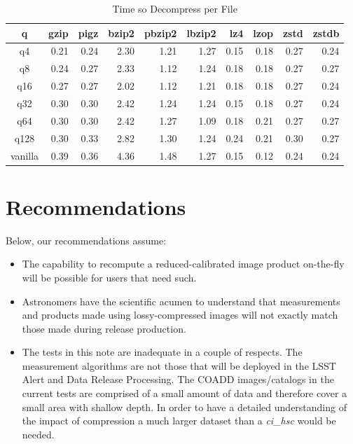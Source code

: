 \begin{table}
\caption{Time so Decompress per File}
\centering
\begin{tabular}[]{crrrrrrrrr}
\hline
 q        &  gzip & pigz & bzip2 & pbzip2 & lbzip2 & lz4 & lzop & zstd & zstdb  \\
\hline
 q4       &    0.21 &   0.24 &   2.30 &   1.21 &   1.27 &   0.15 &   0.18 &   0.27 &   0.24  \\
 q8       &    0.24 &   0.27 &   2.33 &   1.12 &   1.24 &   0.18 &   0.18 &   0.27 &   0.27  \\
 q16      &    0.27 &   0.27 &   2.02 &   1.12 &   1.21 &   0.18 &   0.18 &   0.27 &   0.24  \\
 q32      &    0.30 &   0.30 &   2.42 &   1.24 &   1.24 &   0.15 &   0.18 &   0.27 &   0.24  \\
 q64      &    0.30 &   0.30 &   2.42 &   1.27 &   1.09 &   0.18 &   0.21 &   0.27 &   0.27  \\
 q128     &    0.30 &   0.33 &   2.82 &   1.30 &   1.24 &   0.24 &   0.21 &   0.30 &   0.27  \\
 vanilla  &    0.39 &   0.36 &   4.36 &   1.48 &   1.27 &   0.15 &   0.12 &   0.24 &   0.24  \\
\hline
\end{tabular}
\label{timing_decompress}
\end{table}




\section{Recommendations}

Below, our recommendations assume:
\begin{itemize}
\item The capability to recompute a reduced-calibrated image product on-the-fly will be possible for users that need such.
\item Astronomers have the scientific acumen to understand that measurements and products made using lossy-compressed images will not exactly match those made during release production.
\item The tests in this note are inadequate in a couple of respects.  The measurement algorithms are not those that will be deployed in the LSST Alert and Data Release Processing. The COADD images/catalogs in the current tests are comprised of a small amount of data and therefore cover a small area with shallow depth.  In order to have a detailed understanding of the impact of compression a much larger dataset than a {\it ci\_hsc} would be needed.
\end{itemize}


